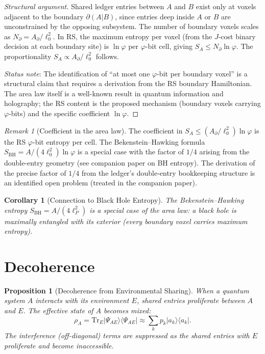 \documentclass[12pt,a4paper]{article}
\newtheorem{corollary}[theorem]{Corollary}
\newtheorem{proposition}[theorem]{Proposition}
\theoremstyle{definition}
\theoremstyle{remark}
\newtheorem{remark}[theorem]{Remark}
\begin{document}
\begin{proof}[Structural argument]
Shared ledger entries between $A$ and $B$ exist only at voxels
adjacent to the boundary $\partial(A|B)$, since entries deep inside
$A$ or $B$ are unconstrained by the opposing subsystem.
The number of boundary voxels scales as $N_{\partial} = A_{\partial}/\ell_0^2$.
In RS, the maximum entropy per voxel (from the $J$-cost binary
decision at each boundary site) is $\ln\varphi$ per $\varphi$-bit
cell, giving $S_A \leq N_{\partial}\ln\varphi$.
The proportionality $S_A \propto A_{\partial}/\ell_0^2$ follows.

\emph{Status note}: The identification of ``at most one $\varphi$-bit
per boundary voxel'' is a structural claim that requires a derivation
from the RS boundary Hamiltonian.  The area law itself is a well-known
result in quantum information and holography; the RS content is the
proposed mechanism (boundary voxels carrying $\varphi$-bits) and the
specific coefficient $\ln\varphi$.
\end{proof}

\begin{remark}[Coefficient in the area law]
\label{rem:area-coeff}
The coefficient in $S_A \leq (A_{\partial}/\ell_0^2)\ln\varphi$ is
the RS $\varphi$-bit entropy per cell.  The Bekenstein--Hawking
formula $S_{\mathrm{BH}} = A/(4\ell_0^2)\ln\varphi$ is a special
case with the factor of $1/4$ arising from the double-entry geometry
(see companion paper on BH entropy).  The derivation of the precise
factor of $1/4$ from the ledger's double-entry bookkeeping structure
is an identified open problem (treated in the companion paper).
\end{remark}

\begin{corollary}[Connection to Black Hole Entropy]
The Bekenstein--Hawking entropy $S_{\mathrm{BH}} = A/(4\ell_P^2)$
is a special case of the area law: a black hole is maximally
entangled with its exterior (every boundary voxel carries maximum
entropy).
\end{corollary}

\section{Decoherence}
\label{sec:decoherence}

\begin{proposition}[Decoherence from Environmental Sharing]
When a quantum system $A$ interacts with its environment $E$,
shared entries proliferate between $A$ and $E$.  The effective
state of $A$ becomes mixed:
\begin{equation}
  \rho_A = \mathrm{Tr}_E |\Psi_{AE}\rangle\langle\Psi_{AE}|
  \approx \sum_k p_k |a_k\rangle\langle a_k|.
\end{equation}
The interference (off-diagonal) terms are suppressed as the shared
entries with $E$ proliferate and become inaccessible.
\end{proposition}
\end{document}

